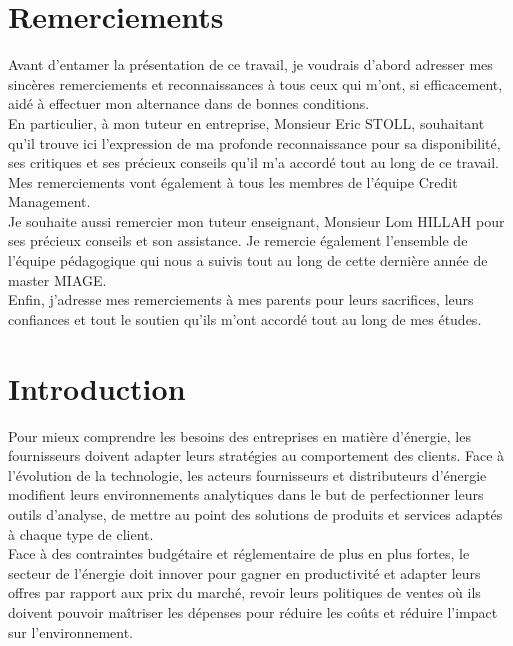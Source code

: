 \documentclass[11pt,a4paper]{report}
\begin{document}
\section*{Remerciements}
\thispagestyle{empty}
Avant d’entamer la présentation de ce travail, je voudrais d’abord adresser mes sincères remerciements et reconnaissances à tous ceux qui m’ont, si efficacement, aidé à effectuer
mon alternance dans de bonnes conditions.\\

En particulier, à mon tuteur en entreprise, Monsieur Eric STOLL, souhaitant qu’il trouve ici l’expression de ma profonde reconnaissance pour sa disponibilité, ses critiques et ses précieux conseils qu’il m’a accordé tout au long de ce travail.
Mes remerciements vont également à tous les membres de l’équipe Credit Management.\\

Je souhaite aussi remercier mon tuteur enseignant, Monsieur Lom HILLAH pour ses précieux conseils et son assistance. Je  remercie également l’ensemble de l’équipe pédagogique qui nous a suivis tout au long de cette dernière année de master MIAGE.\\

Enfin, j'adresse mes remerciements à mes parents pour leurs sacrifices, leurs confiances et tout le soutien qu'ils m'ont accordé tout au long de mes études. \\
 




\newpage
\setcounter{page}{1}
\section*{Introduction}


Pour mieux comprendre les besoins des entreprises en matière d'énergie, les fournisseurs doivent adapter leurs stratégies au comportement des clients. Face à l'évolution de la technologie, les acteurs fournisseurs et distributeurs d'énergie modifient leurs environnements analytiques dans le but de perfectionner leurs outils d'analyse, de mettre au point des solutions de produits et services adaptés à chaque type de client.\\

Face à des contraintes budgétaire et réglementaire de plus en plus fortes, le secteur de l'énergie doit innover pour gagner en productivité et adapter leurs offres par rapport aux prix du marché, revoir leurs politiques de ventes où ils doivent pouvoir maîtriser les dépenses pour réduire les coûts et réduire l'impact sur l'environnement. \\
\end{document}
